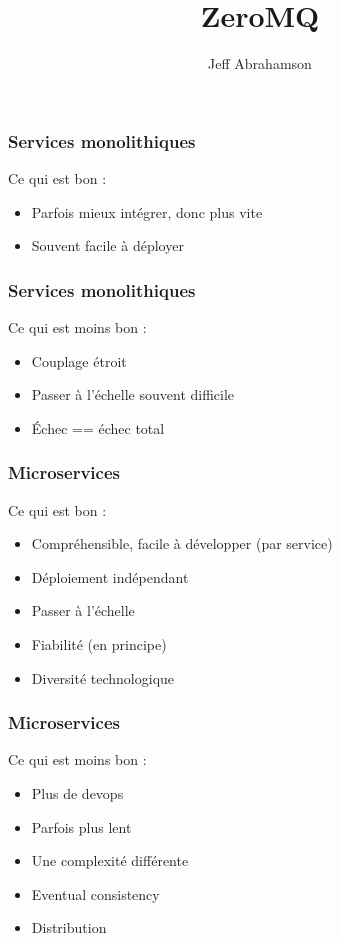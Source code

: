 \documentclass{beamer}
\title
{ZeroMQ}
\author[Abrahamson] {Jeff Abrahamson}\institute{Jellybooks}
\date[15 février 2016]
\begin{document}
\begin{frame}
  \titlepage
\end{frame}

\begin{frame}
  \frametitle{Services monolithiques}

  Ce qui est bon :
  \begin{itemize}
  \item Parfois mieux intégrer, donc plus vite
  \item Souvent facile à déployer
  \end{itemize}
  
\end{frame}

\begin{frame}
  \frametitle{Services monolithiques}

  Ce qui est moins bon :
  \begin{itemize}
  \item Couplage étroit
  \item Passer à l'échelle souvent difficile
  \item Échec == échec total
  \end{itemize}
  
\end{frame}

\begin{frame}
  \frametitle{Microservices}

  Ce qui est bon :
  \begin{itemize}
  \item Compréhensible, facile à développer (par service)
  \item Déploiement indépendant
  \item Passer à l'échelle
  \item Fiabilité (en principe)
  \item Diversité technologique
  \end{itemize}
  
\end{frame}

\begin{frame}
  \frametitle{Microservices}

  Ce qui est moins bon :
  \begin{itemize}
  \item Plus de devops
  \item Parfois plus lent
  \item Une complexité différente
  \item Eventual consistency
  \item Distribution
  \end{itemize}
  
\end{frame}
\end{document}
